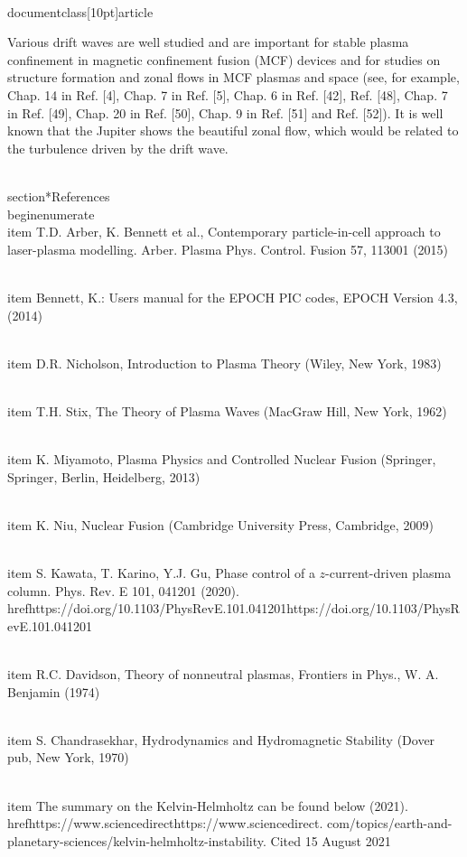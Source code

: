 \\documentclass[10pt]{article}
\begin{document}
{{{{Various drift waves are well studied and are important for stable plasma confinement in magnetic confinement fusion (MCF) devices and for studies on structure formation and zonal flows in MCF plasmas and space (see, for example, Chap. 14
in Ref. [4], Chap. 7 in Ref. [5], Chap. 6 in Ref. [42], Ref. [48], Chap. 7 in Ref. [49], Chap. 20 in Ref. [50], Chap. 9 in Ref. [51] and Ref. [52]). It is well known that the Jupiter shows the beautiful zonal flow, which would be related to the turbulence driven by the drift wave.

\\section*{References}
\\begin{enumerate}
  \\item T.D. Arber, K. Bennett et al., Contemporary particle-in-cell approach to laser-plasma modelling. Arber. Plasma Phys. Control. Fusion 57, 113001 (2015)

  \\item Bennett, K.: Users manual for the EPOCH PIC codes, EPOCH Version 4.3, (2014)

  \\item D.R. Nicholson, Introduction to Plasma Theory (Wiley, New York, 1983)

  \\item T.H. Stix, The Theory of Plasma Waves (MacGraw Hill, New York, 1962)

  \\item K. Miyamoto, Plasma Physics and Controlled Nuclear Fusion (Springer, Springer, Berlin, Heidelberg, 2013)

  \\item K. Niu, Nuclear Fusion (Cambridge University Press, Cambridge, 2009)

  \\item S. Kawata, T. Karino, Y.J. Gu, Phase control of a $z$-current-driven plasma column. Phys. Rev. E 101, 041201 (2020). \\href{https://doi.org/10.1103/PhysRevE.101.041201}{https://doi.org/10.1103/PhysRevE.101.041201}

  \\item R.C. Davidson, Theory of nonneutral plasmas, Frontiers in Phys., W. A. Benjamin (1974)

  \\item S. Chandrasekhar, Hydrodynamics and Hydromagnetic Stability (Dover pub, New York, 1970)

  \\item The summary on the Kelvin-Helmholtz can be found below (2021). \\href{https://www.sciencedirect}{https://www.sciencedirect}. com/topics/earth-and-planetary-sciences/kelvin-helmholtz-instability. Cited 15 August 2021

}}}}
\end{document}

